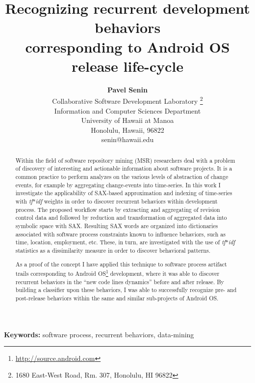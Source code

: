 \documentclass[conference]{IEEEtran}
\title{\bf Recognizing recurrent development behaviors\\ corresponding to Android OS release life-cycle}           %
\author{
{\bfseries Pavel Senin}\\
Collaborative Software Development Laboratory \thanks{1680 East-West Road, Rm. 307, Honolulu, HI 96822}\\
Information and Computer Sciences Department\\
University of Hawaii at Manoa\\
Honolulu, Hawaii, 96822\\
senin@hawaii.edu}
\begin{document}
\maketitle                        %

\begin{abstract}
Within the field of software repository mining (MSR) researchers deal with a problem 
of discovery of interesting and actionable information about software projects.
It is a common practice to perform analyzes on the various levels of abstraction 
of change events, for example by aggregating change-events into time-series.
In this work I investigate the applicability of SAX-based approximation and 
indexing of time-series with \textit{tf$\ast$idf} weights in order to discover 
recurrent behaviors within development process. 
The proposed workflow starts by extracting and aggregating of revision control data 
and followed by reduction and transformation of aggregated data into symbolic space with SAX. 
Resulting SAX words are organized into dictionaries associated with software process 
constraints known to influence behaviors, such as time, location, employment, etc. 
These, in turn, are investigated with the use of \textit{tf$\ast$idf} 
statistics as a dissimilarity measure in order to discover behavioral patterns.

As a proof of the concept I have applied this technique to software process artifact trails 
corresponding to Android OS\footnote[1]{\url{http://source.android.com}} development, where
it was able to discover recurrent behaviors in the ``new code lines dynamics'' before 
and after release. By building a classifier upon these behaviors, I was able to successfully 
recognize pre- and post-release behaviors within the same and similar sub-projects of Android OS.
\end{abstract}

\vspace{1em}
\noindent\textbf{Keywords:}
 {\small  software process, recurrent behaviors, data-mining} %

%
\end{document}

